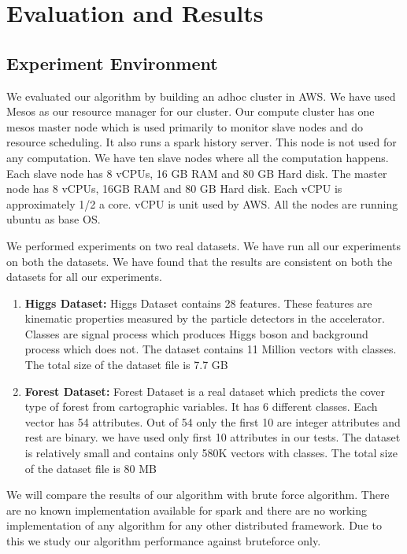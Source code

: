 \chapter{Evaluation and Results} \label{chap:Evaluation and Results}

\section{Experiment Environment}

We evaluated our algorithm by building an adhoc cluster in AWS. We
have used Mesos as our resource manager for our cluster. Our compute
cluster has one mesos master node which is used
primarily to monitor slave nodes and do resource scheduling.
It also runs a spark history server. This node is not used for any computation.
We have ten slave nodes where all the computation happens. Each slave node has
8 vCPUs, 16 GB RAM and 80 GB Hard disk. The master node has 8 vCPUs,
16GB RAM and 80 GB Hard disk. Each vCPU is approximately 1/2 a
core. vCPU is unit used by AWS. All the nodes are running ubuntu as
base OS.

We performed experiments on two real datasets. We have run all our
experiments on both the datasets. We have found that the results are
consistent on both the datasets for all our experiments.

\begin{enumerate}
\item \textbf{Higgs Dataset:}
Higgs Dataset contains 28 features. These features are kinematic
properties measured by the particle detectors in the
accelerator. Classes are signal process which produces Higgs boson and
background process which does not. The dataset contains 11 Million
vectors with classes. The total size of the dataset file is 7.7 GB

\item \textbf{Forest Dataset:}
Forest Dataset is a real dataset which predicts the cover type of
forest from cartographic variables. It has 6 different classes. Each
vector has 54 attributes. Out of 54 only the first 10 are integer
attributes and rest are binary. we have used only first 10 attributes
in our tests. The dataset is relatively small and contains only 580K
vectors with classes. The total size of the dataset file is 80 MB
\end{enumerate}

We will compare the results of our algorithm with brute force
algorithm. There are no known implementation available for spark and
there are no working implementation of any algorithm for any other
distributed framework. Due to this we study our algorithm performance
against bruteforce only.


